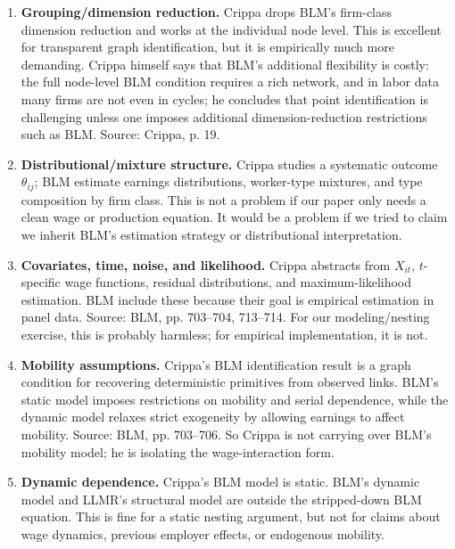 \documentclass[11pt]{article}
\begin{document}
\begin{enumerate}
\item \textbf{Grouping/dimension reduction.} Crippa drops BLM's firm-class
dimension reduction and works at the individual node level. This is excellent for
transparent graph identification, but it is empirically much more demanding. Crippa
himself says that BLM's additional flexibility is costly: the full node-level BLM
condition requires a rich network, and in labor data many firms are not even in cycles;
he concludes that point identification is challenging unless one imposes additional
dimension-reduction restrictions such as BLM. Source: Crippa, p. 19.

\item \textbf{Distributional/mixture structure.} Crippa studies a systematic outcome
$\theta_{ij}$; BLM estimate earnings distributions, worker-type mixtures, and type
composition by firm class. This is not a problem if our paper only needs a clean wage
or production equation. It would be a problem if we tried to claim we inherit BLM's
estimation strategy or distributional interpretation.

\item \textbf{Covariates, time, noise, and likelihood.} Crippa abstracts from
$X_{it}$, $t$-specific wage functions, residual distributions, and maximum-likelihood
estimation. BLM include these because their goal is empirical estimation in panel
data. Source: BLM, pp. 703--704, 713--714. For our modeling/nesting exercise, this
is probably harmless; for empirical implementation, it is not.

\item \textbf{Mobility assumptions.} Crippa's BLM identification result is a graph
condition for recovering deterministic primitives from observed links. BLM's static
model imposes restrictions on mobility and serial dependence, while the dynamic model
relaxes strict exogeneity by allowing earnings to affect mobility. Source: BLM,
pp. 703--706. So Crippa is not carrying over BLM's mobility model; he is isolating
the wage-interaction form.

\item \textbf{Dynamic dependence.} Crippa's BLM model is static. BLM's dynamic
model and LLMR's structural model are outside the stripped-down BLM equation. This
is fine for a static nesting argument, but not for claims about wage dynamics, previous
employer effects, or endogenous mobility.
\end{enumerate}
\end{document}

